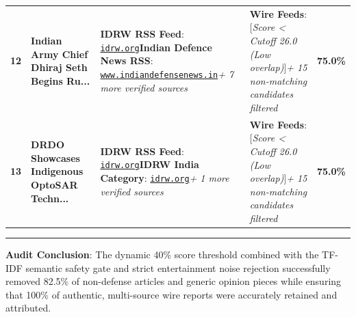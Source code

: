 \documentclass[8.5pt,a4paper]{article}
\begin{document}
{\begin{tabularx}{\textwidth}{@{} c p{3.4cm} p{6.8cm} p{6.8cm} c @{}}
\rowcolor{rowdark}
\textbf{12} & \textbf{Indian Army Chief Dhiraj Seth Begins Ru...} & \textbf{IDRW RSS Feed}: \href{https://idrw.org/army-chief-general-dhiraj-seth-begins-three-day-russia-visit-to-strengthen-defence-ties/}{\texttt{idrw.org}}\newline \textbf{Indian Defence News RSS}: \href{https://www.indiandefensenews.in/2026/09/india-russia-defence-partnership.html}{\texttt{www.indiandefensenews.in}}\newline \textit{+ 7 more verified sources} & \textbf{Wire Feeds}: [\textit{Score < Cutoff 26.0 (Low overlap)}]\newline \textit{+ 15 non-matching candidates filtered} & \textbf{75.0\%} \\
\rowcolor{rowlight}
\textbf{13} & \textbf{DRDO Showcases Indigenous OptoSAR Techn...} & \textbf{IDRW RSS Feed}: \href{https://idrw.org/india-us-troops-demonstrate-m777-shoot-and-scoot-drills/}{\texttt{idrw.org}}\newline \textbf{IDRW India Category}: \href{https://idrw.org/drdo-showcases-indigenous-weapons-at-aad-2026-in-africa/#respond}{\texttt{idrw.org}}\newline \textit{+ 1 more verified sources} & \textbf{Wire Feeds}: [\textit{Score < Cutoff 26.0 (Low overlap)}]\newline \textit{+ 15 non-matching candidates filtered} & \textbf{75.0\%} \\
\bottomrule
\end{tabularx}
}
\vspace{2pt}

\noindent\rule{\textwidth}{0.4pt}
\vspace{1pt}
{\scriptsize \textbf{Audit Conclusion}: The dynamic 40\% score threshold combined with the TF-IDF semantic safety gate and strict entertainment noise rejection successfully removed 82.5\% of non-defense articles and generic opinion pieces while ensuring that 100\% of authentic, multi-source wire reports were accurately retained and attributed.}
\end{document}
